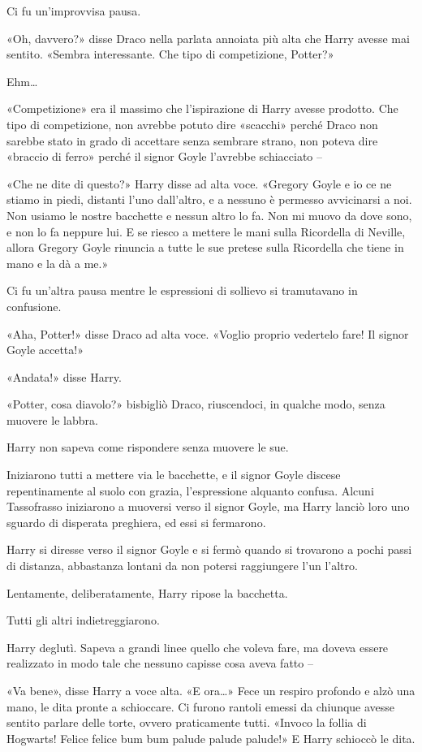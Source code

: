 Ci fu un’improvvisa pausa.

«Oh, davvero?» disse Draco nella parlata annoiata più alta che Harry avesse mai sentito. «Sembra interessante. Che tipo di competizione, Potter?»

Ehm…

«Competizione» era il massimo che l’ispirazione di Harry avesse prodotto. Che tipo di competizione, non avrebbe potuto dire «scacchi» perché Draco non sarebbe stato in grado di accettare senza sembrare strano, non poteva dire «braccio di ferro» perché il signor Goyle l’avrebbe schiacciato –

«Che ne dite di questo?» Harry disse ad alta voce. «Gregory Goyle e io ce ne stiamo in piedi, distanti l’uno dall’altro, e a nessuno è permesso avvicinarsi a noi. Non usiamo le nostre bacchette e nessun altro lo fa. Non mi muovo da dove sono, e non lo fa neppure lui. E se riesco a mettere le mani sulla Ricordella di Neville, allora Gregory Goyle rinuncia a tutte le sue pretese sulla Ricordella che tiene in mano e la dà a me.»

Ci fu un’altra pausa mentre le espressioni di sollievo si tramutavano in confusione.

«Aha, Potter!» disse Draco ad alta voce. «Voglio proprio vedertelo fare! Il signor Goyle accetta!»

«Andata!» disse Harry.

«Potter, cosa diavolo?» bisbigliò Draco, riuscendoci, in qualche modo, senza muovere le labbra.

Harry non sapeva come rispondere senza muovere le sue.

Iniziarono tutti a mettere via le bacchette, e il signor Goyle discese repentinamente al suolo con grazia, l’espressione alquanto confusa. Alcuni Tassofrasso iniziarono a muoversi verso il signor Goyle, ma Harry lanciò loro uno sguardo di disperata preghiera, ed essi si fermarono.

Harry si diresse verso il signor Goyle e si fermò quando si trovarono a pochi passi di distanza, abbastanza lontani da non potersi raggiungere l’un l’altro.

Lentamente, deliberatamente, Harry ripose la bacchetta.

Tutti gli altri indietreggiarono.

Harry deglutì. Sapeva a grandi linee quello che voleva fare, ma doveva essere realizzato in modo tale che nessuno capisse cosa aveva fatto –

«Va bene», disse Harry a voce alta. «E ora…» Fece un respiro profondo e alzò una mano, le dita pronte a schioccare. Ci furono rantoli emessi da chiunque avesse sentito parlare delle torte, ovvero praticamente tutti. «Invoco la follia di Hogwarts! Felice felice bum bum palude palude palude!» E Harry schioccò le dita.

